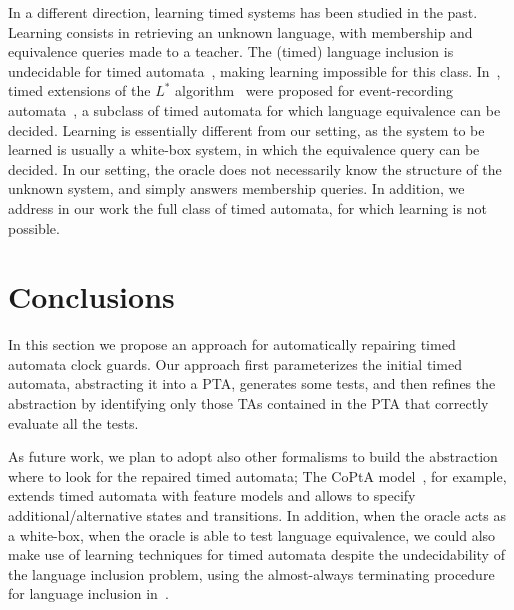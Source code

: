 \begin{tikzborder}{\cite{Gargantini16:validation}}
\begin{tikzborder}{\cite{gargantini_combinatorial_2017}}
\begin{tikzborder}{\cite{gargantini_combinatorial_2017}}
\begin{tikzborder}{\cite{garn2019}}
\begin{tikzborder}{\cite{arcaini2019achieving}}
\begin{tikzborder}{\cite{arcaini2019varivolution}}


\vspace{5pt}

In a different direction, learning timed systems has been studied in the past.
Learning consists in retrieving an unknown language, with membership and equivalence queries made to a teacher.
The (timed) language inclusion is undecidable for timed automata~\cite{AD94}, making learning impossible for this class.
In~\cite{GJL10,LALSD14}, timed extensions of the $L^*$ algorithm~\cite{Angluin87} were proposed for event-recording automata~\cite{AFH99}, a subclass of timed automata for which language equivalence can be decided.
Learning is essentially different from our setting, as the system to be learned is usually a white-box system, in which the equivalence query can be decided.
In our setting, the oracle does not necessarily know the structure of the unknown system, and simply answers membership queries.
In addition, we address in our work the full class of timed automata, for which learning is not possible.
\end{tikzborder}


\section{Conclusions}\label{sec:conclusions2}

In this section we propose an approach for automatically repairing timed automata clock guards.
Our approach first parameterizes the initial timed automata, abstracting it into a PTA, generates some tests, and then refines the abstraction by identifying only those TAs contained in the PTA that correctly evaluate all the tests.

As future work, we plan to adopt also other formalisms to build the abstraction where to look for the repaired timed automata;
The CoPtA model~\cite{luthmann2019minimum}, for example, extends timed automata with feature models and allows to specify additional/alternative states and transitions.
In addition, when the oracle acts as a white-box, \ie{} when the oracle is able to test language equivalence, we could also make use of learning techniques for timed automata despite the undecidability of the language inclusion problem, using the almost-always terminating procedure for language inclusion in~\cite{WSLWL14}.


\end{tikzborder}
\end{tikzborder}
\end{tikzborder}
\end{tikzborder}
\end{tikzborder}

